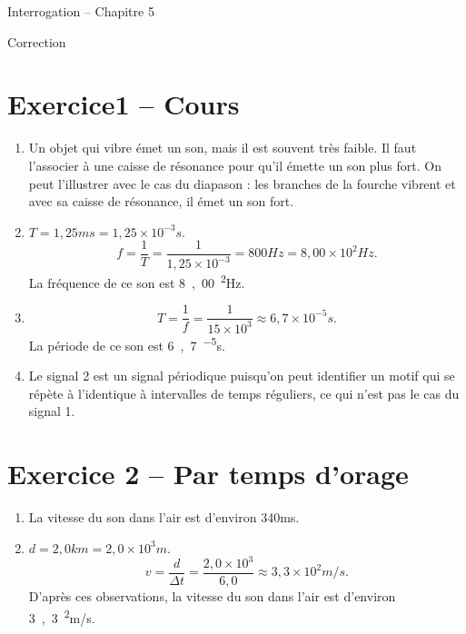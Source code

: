\documentclass[12pt,a4paper,fleqn]{article}
\begin{document}
\begin{header}
Interrogation -- Chapitre 5

Correction
\end{header}

\section*{Exercice1 -- Cours}

\begin{enumerate}
\item Un objet qui vibre émet un son, mais il est souvent très faible.
Il faut l'associer à une caisse de résonance pour qu'il émette un son plus fort.
On peut l'illustrer avec le cas du diapason : les branches de la fourche vibrent et avec sa caisse de résonance, il émet un son fort.

\item $ T = \unit{1{,}25}{ms} = \unit{1{,}25\times10^{-3}}{s}.$
\[
f = \frac{1}{T} = \frac{1}{1{,}25\times10^{-3}} = \unit{800}{Hz} = \unit{8{,}00\times10^2}{Hz}.
\]
La fréquence de ce son est \unit{8{,}00^2}{Hz}.

\item
\[
T=\frac{1}{f} = \frac{1}{15\times10^3} \approx \unit{6{,}7\times10^{-5}}{s}.
\]
La période de ce son est \unit{6{,}7^{-5}}{s}.

\item Le signal 2 est un signal périodique puisqu'on peut identifier un motif qui se répète à l'identique à intervalles de temps réguliers, ce qui n'est pas le cas du signal 1.	
\end{enumerate}

\section*{Exercice 2 -- Par temps d'orage}

\begin{enumerate}
\item La vitesse du son dans l'air est d'environ \unit{340}{m\per s}.

\item $ d = \unit{2{,}0}{km} = \unit{2{,}0\times10^3}{m}.$
\[
v = \frac{d}{\Delta t} = \frac{2{,}0\times10^3}{6{,}0} \approx \unit{3{,}3\times10^2}{m/s}.
\]
D'après ces observations, la vitesse du son dans l'air est d'environ \unit{3{,}3^2}{m/s}.

\end{enumerate}
\end{document}
